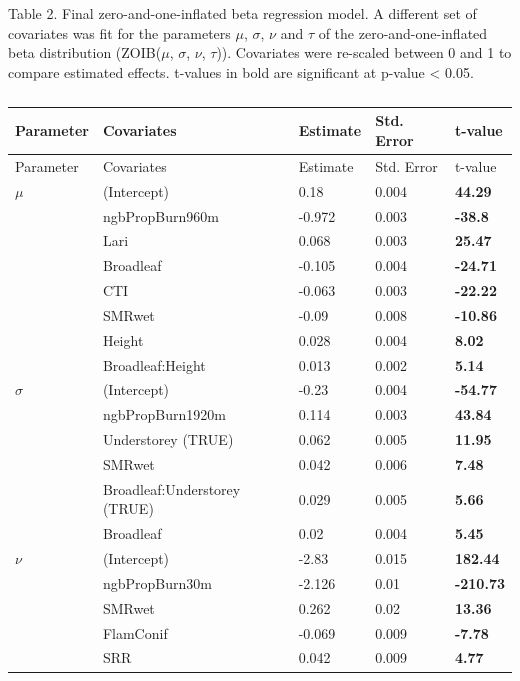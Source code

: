 \documentclass[
  numafflabel,
  authoryear,
  preprint]{elsarticle}
\begin{document}
\newpage{}

Table 2. Final zero-and-one-inflated beta regression model. A different
set of covariates was fit for the parameters \(\mu\), \(\sigma\),
\(\nu\) and \(\tau\) of the zero-and-one-inflated beta distribution
(ZOIB(\(\mu\), \(\sigma\), \(\nu\), \(\tau\))). Covariates were
re-scaled between 0 and 1 to compare estimated effects. t-values in bold
are significant at p-value \textless{} 0.05.

\begin{longtable}[]{@{}lllll@{}}
\caption{}\label{tbl-2}\tabularnewline
\toprule\noalign{}
Parameter & Covariates & Estimate & Std. Error & t-value \\
\midrule\noalign{}
\endfirsthead
\toprule\noalign{}
Parameter & Covariates & Estimate & Std. Error & t-value \\
\midrule\noalign{}
\endhead
\bottomrule\noalign{}
\endlastfoot
\(\mu\) & (Intercept) & 0.18 & 0.004 & \textbf{44.29} \\
& ngbPropBurn960m & -0.972 & 0.003 & \textbf{-38.8} \\
& Lari & 0.068 & 0.003 & \textbf{25.47} \\
& Broadleaf & -0.105 & 0.004 & \textbf{-24.71} \\
& CTI & -0.063 & 0.003 & \textbf{-22.22} \\
& SMRwet & -0.09 & 0.008 & \textbf{-10.86} \\
& Height & 0.028 & 0.004 & \textbf{8.02} \\
& Broadleaf:Height & 0.013 & 0.002 & \textbf{5.14} \\
\(\sigma\) & (Intercept) & -0.23 & 0.004 & \textbf{-54.77} \\
& ngbPropBurn1920m & 0.114 & 0.003 & \textbf{43.84} \\
& Understorey (TRUE) & 0.062 & 0.005 & \textbf{11.95} \\
& SMRwet & 0.042 & 0.006 & \textbf{7.48} \\
& Broadleaf:Understorey (TRUE) & 0.029 & 0.005 & \textbf{5.66} \\
& Broadleaf & 0.02 & 0.004 & \textbf{5.45} \\
\(\nu\) & (Intercept) & -2.83 & 0.015 & \textbf{182.44} \\
& ngbPropBurn30m & -2.126 & 0.01 & \textbf{-210.73} \\
& SMRwet & 0.262 & 0.02 & \textbf{13.36} \\
& FlamConif & -0.069 & 0.009 & \textbf{-7.78} \\
& SRR & 0.042 & 0.009 & \textbf{4.77} \\

\end{longtable}
\end{document}
